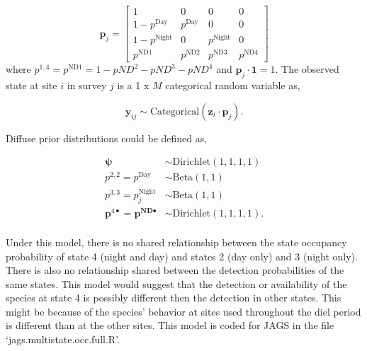 \documentclass[12pt]{article}
\begin{document}
\begin{equation}
\boldsymbol{p}_{j} = \begin{bmatrix} 1 & 0 & 0 & 0 \\ 
									1-p^{\text{Day}} & p^{\text{Day}} & 0 & 0 \\ 
									1-p^{\text{Night}} & 0 & p^{\text{Night}} & 0\\
  								      p^{\text{ND1}} & p^{\text{ND2}} & p^{\text{ND3}} & p^{\text{ND4}}
  								      \end{bmatrix}
\end{equation}
where $p^{1,4} = p^{\text{ND1}} = 1-pND^{2} - pND^{3} -pND^{4}$ and $\boldsymbol{p}_{j} \cdot \boldsymbol{1} = 1$. The observed state at site $i$ in survey $j$ is a 1 x $M$ categorical random variable as,

\begin{equation}
\textbf{y}_{ij} \sim \text{Categorical}(\textbf{z}_{i} \cdot \boldsymbol{p}_{j}).
\end{equation}

Diffuse prior distributions could be defined as,
\begin{center}
\begin{align*}
\boldsymbol{\psi} &\sim \text{Dirichlet}(1,1,1,1)\\
p^{2,2}= p^{\text{Day}} &\sim \text{Beta}(1,1)\\
p^{3,3} = p_{j}^{\text{Night}}  &\sim \text{Beta}(1,1)\\
\boldsymbol{p}^{4 \bullet} = \boldsymbol{p^{\text{ND}\bullet}} &\sim \text{Dirichlet}(1,1,1,1).\\
\end{align*}
\end{center}

Under this model, there is no shared relationship between the state occupancy probability of state 4 (night and day) and states 2 (day only) and 3 (night only). There is also no relationship shared between the detection probabilities of the same states. This model would suggest that the detection or availability of the species at state 4 is possibly different then the detection in other states. This might be because of the species' behavior at sites used throughout the diel period is different than at the other sites. This model is coded for JAGS in the file `jags.multistate.occ.full.R'.
\end{document}
